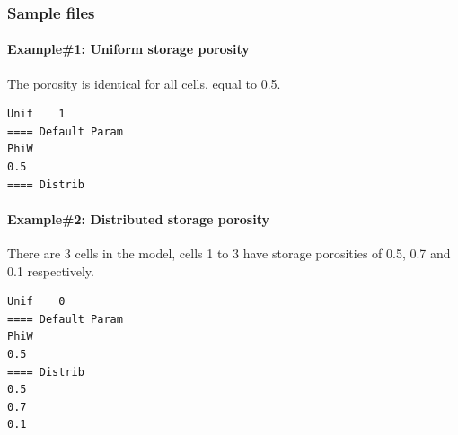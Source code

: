 \subsubsection{Sample files}
%
\paragraph*{Example\#1: Uniform storage porosity}
The porosity is identical for all cells, equal to 0.5.
\begin{verbatim}
Unif	1
==== Default Param
PhiW
0.5
==== Distrib
\end{verbatim}
%
\paragraph*{Example\#2: Distributed storage porosity}
There are 3 cells in the model, cells 1 to 3 have storage porosities of 0.5, 0.7 and 0.1 respectively.
\begin{verbatim}
Unif	0
==== Default Param
PhiW
0.5
==== Distrib
0.5
0.7
0.1
\end{verbatim}
